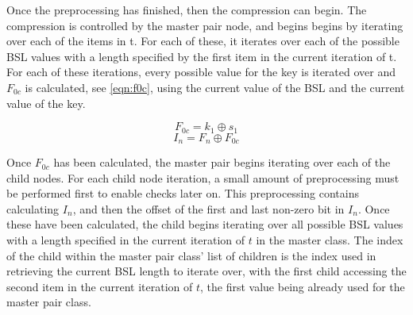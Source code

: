 \documentclass{hehe}
\begin{document}
Once the preprocessing has finished, then the compression can begin. The compression is controlled by the master pair node, and begins begins by iterating over each of the items in t. For each of these, it iterates over each of the possible BSL values with a length specified by the first item in the current iteration of t. For each of these iterations, every possible value for the key is iterated over and $F_{0c}$ is calculated, see \cref{eqn:f0c}, using the current value of the BSL and the current value of the key.

\begin{equation}\label{eqn:f0c}
  F_{0c}=k_1\oplus s_1
\end{equation}
\begin{equation}\label{eqn:in}
  I_n=F_n\oplus F_{0c}
\end{equation}

Once $F_{0c}$ has been calculated, the master pair begins iterating over each of the child nodes. For each child node iteration, a small amount of preprocessing must be performed first to enable checks later on. This preprocessing contains calculating $I_n$, and then the offset of the first and last non-zero bit in $I_n$. Once these have been calculated, the child begins iterating over all possible BSL values with a length specified in the current iteration of $t$ in the master class. The index of the child within the master pair class' list of children is the index used in retrieving the current BSL length to iterate over, with the first child accessing the second item in the current iteration of $t$, the first value being already used for the master pair class.
\end{document}
